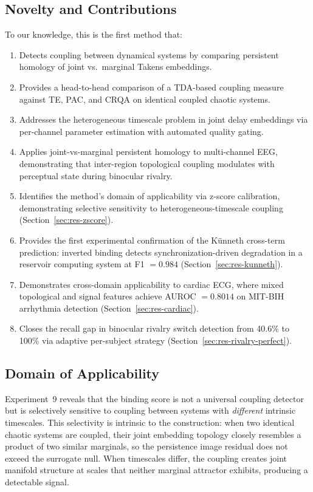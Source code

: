 \documentclass[11pt,a4paper]{article}
\begin{document}
\subsection{Novelty and Contributions}

To our knowledge, this is the first method that:
\begin{enumerate}
    \item Detects coupling between dynamical systems by comparing persistent homology of joint vs.\ marginal Takens embeddings.
    \item Provides a head-to-head comparison of a TDA-based coupling measure against TE, PAC, and CRQA on identical coupled chaotic systems.
    \item Addresses the heterogeneous timescale problem in joint delay embeddings via per-channel parameter estimation with automated quality gating.
    \item Applies joint-vs-marginal persistent homology to multi-channel EEG, demonstrating that inter-region topological coupling modulates with perceptual state during binocular rivalry.
    \item Identifies the method's domain of applicability via z-score calibration, demonstrating selective sensitivity to heterogeneous-timescale coupling (Section~\ref{sec:res-zscore}).
    \item Provides the first experimental confirmation of the K\"unneth cross-term prediction: inverted binding detects synchronization-driven degradation in a reservoir computing system at F1 $= 0.984$ (Section~\ref{sec:res-kunneth}).
    \item Demonstrates cross-domain applicability to cardiac ECG, where mixed topological and signal features achieve AUROC $= 0.8014$ on MIT-BIH arrhythmia detection (Section~\ref{sec:res-cardiac}).
    \item Closes the recall gap in binocular rivalry switch detection from 40.6\% to 100\% via adaptive per-subject strategy (Section~\ref{sec:res-rivalry-perfect}).
\end{enumerate}

\subsection{Domain of Applicability}

Experiment~9 reveals that the binding score is not a universal coupling detector but is selectively sensitive to coupling between systems with \emph{different} intrinsic timescales.
This selectivity is intrinsic to the construction: when two identical chaotic systems are coupled, their joint embedding topology closely resembles a product of two similar marginals, so the persistence image residual does not exceed the surrogate null.
When timescales differ, the coupling creates joint manifold structure at scales that neither marginal attractor exhibits, producing a detectable signal.
\end{document}
